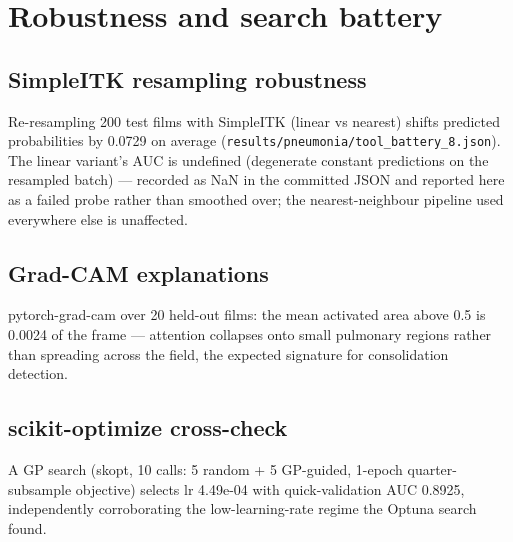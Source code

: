 
\section{Robustness and search battery}
\subsection{SimpleITK resampling robustness}
Re-resampling 200 test films with SimpleITK (linear vs nearest) shifts
predicted probabilities by 0.0729 on
average (\texttt{results/pneumonia/tool\_battery\_8.json}). The linear
variant's AUC is undefined (degenerate constant predictions on the
resampled batch) --- recorded as NaN in the committed JSON and reported
here as a failed probe rather than smoothed over; the nearest-neighbour
pipeline used everywhere else is unaffected.
\subsection{Grad-CAM explanations}
pytorch-grad-cam over 20 held-out films: the mean
activated area above 0.5 is 0.0024 of the frame
--- attention collapses onto small pulmonary regions rather than spreading
across the field, the expected signature for consolidation detection.
\subsection{scikit-optimize cross-check}
A GP search (skopt, 10 calls: 5 random + 5 GP-guided,
1-epoch quarter-subsample objective) selects lr
4.49e-04 with quick-validation AUC 0.8925,
independently corroborating the low-learning-rate regime the Optuna search
found.
